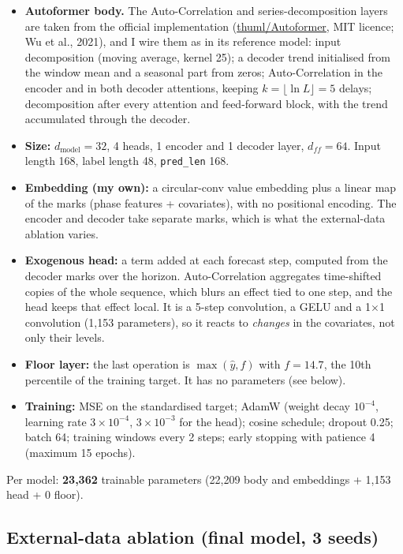 \begin{itemize}
  \item \textbf{Autoformer body.} The Auto-Correlation and series-decomposition layers are taken from the official implementation (\href{https://github.com/thuml/Autoformer}{thuml/Autoformer}, MIT licence; Wu et al., 2021), and I wire them as in its reference model: input decomposition (moving average, kernel 25); a decoder trend initialised from the window mean and a seasonal part from zeros; Auto-Correlation in the encoder and in both decoder attentions, keeping $k=\lfloor \ln L\rfloor = 5$ delays; decomposition after every attention and feed-forward block, with the trend accumulated through the decoder.
  \item \textbf{Size:} $d_{\text{model}}=32$, 4 heads, 1 encoder and 1 decoder layer, $d_{ff}=64$. Input length 168, label length 48, \texttt{pred\_len} 168.
  \item \textbf{Embedding (my own):} a circular-conv value embedding plus a linear map of the marks (phase features + covariates), with no positional encoding. The encoder and decoder take separate marks, which is what the external-data ablation varies.
  \item \textbf{Exogenous head:} a term added at each forecast step, computed from the decoder marks over the horizon. Auto-Correlation aggregates time-shifted copies of the whole sequence, which blurs an effect tied to one step, and the head keeps that effect local. It is a 5-step convolution, a GELU and a 1$\times$1 convolution (1{,}153 parameters), so it reacts to \emph{changes} in the covariates, not only their levels.
  \item \textbf{Floor layer:} the last operation is $\max(\hat y, f)$ with $f=14.7$, the 10th percentile of the training target. It has no parameters (see below).
  \item \textbf{Training:} MSE on the standardised target; AdamW (weight decay $10^{-4}$, learning rate $3\times10^{-4}$, $3\times10^{-3}$ for the head); cosine schedule; dropout 0.25; batch 64; training windows every 2 steps; early stopping with patience 4 (maximum 15 epochs).
\end{itemize}
Per model: \textbf{23{,}362} trainable parameters (22{,}209 body and embeddings + 1{,}153 head + 0 floor).

\subsection*{External-data ablation (final model, 3 seeds)}

